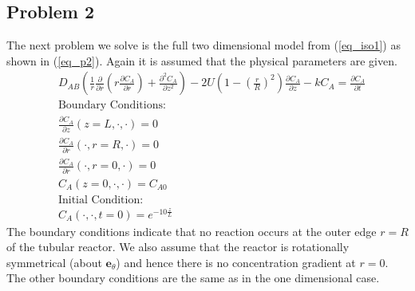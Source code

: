 \documentclass[11pt,fleqn]{article}
\theoremstyle{defstyle}
\begin{document}
\subsection{Problem 2}
\label{section_iso2}
The next problem we solve is the full two dimensional model from (\ref{eq_iso1}) as shown in (\ref{eq_p2}). Again it is assumed that the physical parameters are given.
\begin{equation}
\begin{aligned}
&D_{AB}(\frac{1}{r}\frac{\partial}{\partial r}(r\frac{\partial C_A}{\partial r}) + \frac{\partial^2 C_A}{\partial z^2}) - 2U(1-(\frac{r}{R})^2)\frac{\partial C_A}{\partial z} - kC_A = \frac{\partial C_A}{\partial t}\\
&\text{Boundary Conditions:} \\
&\frac{\partial C_A}{\partial z}(z=L, \cdot, \cdot) = 0\\
&\frac{\partial C_A}{\partial r}(\cdot, r = R, \cdot) = 0 \\
&\frac{\partial C_A}{\partial r}(\cdot, r = 0, \cdot) = 0 \\
&C_A(z=0,\cdot, \cdot) = C_{A0} \\
&\text{Initial Condition:} \\
& C_A(\cdot, \cdot, t= 0) = e^{-10\frac{z}{L}}
\end{aligned}
\label{eq_p2}
\end{equation}
The boundary conditions indicate that no reaction occurs at the outer edge $r=R$ of the tubular reactor. We also assume that the reactor is rotationally symmetrical (about $\mathbf{e}_\theta$) and hence there is no concentration gradient at $r=0$. The other boundary conditions are the same as in the one dimensional case. 
\end{document}
